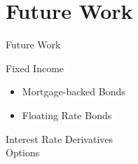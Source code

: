\documentclass[]{beamer}
\begin{document}
\section{Future Work}

\begin{frame}{Future Work}
  \begin{block}{Fixed Income}
    \begin{itemize}
      \item Mortgage-backed Bonds
      \item Floating Rate Bonds
    \end{itemize}
  \end{block}
            Interest Rate Derivatives\\
            Options
\end{frame}

%  
%  
\end{document}

